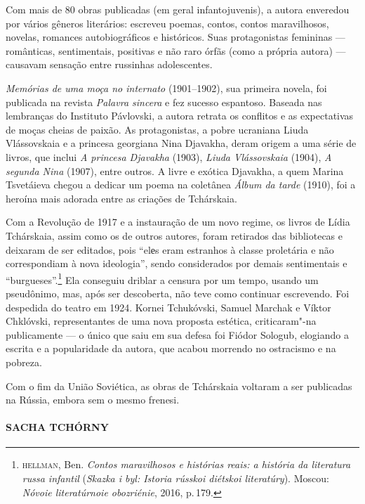 Com mais de 80 obras publicadas (em geral infantojuvenis), a autora
enveredou por vários gêneros literários: escreveu poemas, contos, contos
maravilhosos, novelas, romances autobiográficos e históricos. Suas
protagonistas femininas --- românticas, sentimentais, positivas e não
raro órfãs (como a própria autora) --- causavam sensação entre russinhas
adolescentes.

\emph{Memórias de uma moça no internato} (1901--1902), sua primeira
novela, foi publicada na revista \emph{Palavra sincera} e fez sucesso
espantoso. Baseada nas lembranças do Instituto Pávlovski, a autora
retrata os conflitos e as expectativas de moças cheias de paixão. As
protagonistas, a pobre ucraniana Liuda Vlássovskaia e a princesa
georgiana Nina Djavakha, deram origem a uma série de livros, que inclui
\emph{A princesa Djavakha} (1903), \emph{Liuda Vlássovskaia} (1904),
\emph{A segunda Nina} (1907), entre outros. A livre e exótica Djavakha,
a quem Marina Tsvetáieva chegou a dedicar um poema na coletânea
\emph{Álbum da tarde} (1910), foi a heroína mais adorada entre as
criações de Tchárskaia.

Com a Revolução de 1917 e a instauração de um novo regime, os livros de
Lídia Tchárskaia, assim como os de outros autores, foram retirados das
bibliotecas e deixaram de ser editados, pois ``elеs eram estranhos à
classe proletária e não correspondiam à nova ideologia'', sendo
considerados por demais sentimentais e ``burgueses''.\footnote{\scriptsize\textsc{hellman}, Ben. \textit{Contos maravilhosos e histórias reais: a história da literatura russa infantil} (\textit{Skazka i byl: Istoria rússkoi diétskoi literatúry}). Moscou: \textit{Nóvoie literatúrnoie obozriénie}, 2016, p.\,179.}
Ela conseguiu driblar a censura por um tempo, usando um pseudônimo, mas,
após ser descoberta, não teve como continuar escrevendo. Foi
despedida do teatro em 1924. Kornei Tchukóvski, Samuel Marchak e Víktor
Chklóvski, representantes de uma nova proposta estética, criticaram"-na
publicamente --- o único que saiu em sua defesa foi Fiódor Sologub,
elogiando a escrita e a popularidade da autora, que acabou morrendo no
ostracismo e na pobreza.

Com o fim da União Soviética, as obras de Tchárskaia voltaram a ser
publicadas na Rússia, embora sem o mesmo frenesi.

\paragraph{SACHA TCHÓRNY}

